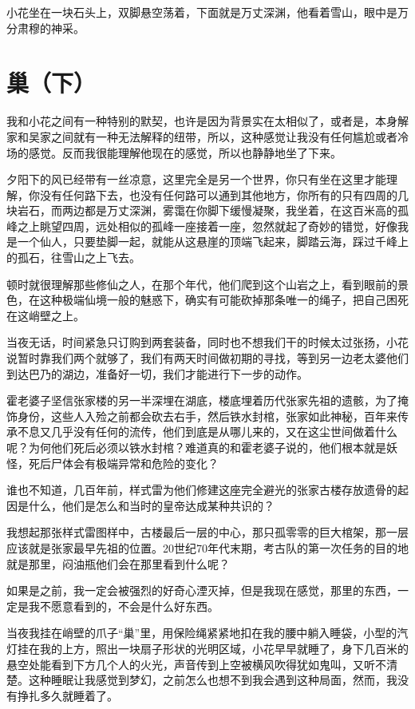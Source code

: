 小花坐在一块石头上，双脚悬空荡着，下面就是万丈深渊，他看着雪山，眼中是万分肃穆的神采。

\chapter{巢（下）}

我和小花之间有一种特别的默契，也许是因为背景实在太相似了，或者是，本身解家和吴家之间就有一种无法解释的纽带，所以，这种感觉让我没有任何尴尬或者冷场的感觉。反而我很能理解他现在的感觉，所以也静静地坐了下来。

夕阳下的风已经带有一丝凉意，这里完全是另一个世界，你只有坐在这里才能理解，你没有任何路下去，也没有任何路可以通到其他地方，你所有的只有四周的几块岩石，而两边都是万丈深渊，雾霭在你脚下缓慢凝聚，我坐着，在这百米高的孤峰之上眺望四周，远处相似的孤峰一座接着一座，忽然就起了奇妙的错觉，好像我是一个仙人，只要垫脚一起，就能从这悬崖的顶端飞起来，脚踏云海，踩过千峰上的孤石，往雪山之上飞去。

顿时就很理解那些修仙之人，在那个年代，他们爬到这个山岩之上，看到眼前的景色，在这种极端仙境一般的魅惑下，确实有可能砍掉那条唯一的绳子，把自己困死在这峭壁之上。

当夜无话，时间紧急只订购到两套装备，同时也不想我们干的时候太过张扬，小花说暂时靠我们两个就够了，我们有两天时间做初期的寻找，等到另一边老太婆他们到达巴乃的湖边，准备好一切，我们才能进行下一步的动作。

霍老婆子坚信张家楼的另一半深埋在湖底，楼底埋着历代张家先祖的遗骸，为了掩饰身份，这些人入殓之前都会砍去右手，然后铁水封棺，张家如此神秘，百年来传承不息又几乎没有任何的流传，他们到底是从哪儿来的，又在这尘世间做着什么呢？为何他们死后必须以铁水封棺？难道真的和霍老婆子说的，他们根本就是妖怪，死后尸体会有极端异常和危险的变化？

谁也不知道，几百年前，样式雷为他们修建这座完全避光的张家古楼存放遗骨的起因是什么，他们是怎么和当时的皇帝达成某种共识的？

我想起那张样式雷图样中，古楼最后一层的中心，那只孤零零的巨大棺架，那一层应该就是张家最早先祖的位置。20世纪70年代末期，考古队的第一次任务的目的地就是那里，闷油瓶他们会在那里看到什么呢？

如果是之前，我一定会被强烈的好奇心湮灭掉，但是我现在感觉，那里的东西，一定是我不愿意看到的，不会是什么好东西。

当夜我挂在峭壁的爪子“巢”里，用保险绳紧紧地扣在我的腰中躺入睡袋，小型的汽灯挂在我的上方，照出一块扇子形状的光明区域，小花早早就睡了，身下几百米的悬空处能看到下方几个人的火光，声音传到上空被横风吹得犹如鬼叫，又听不清楚。这种睡眠让我感觉到梦幻，之前怎么也想不到我会遇到这种局面，然而，我没有挣扎多久就睡着了。

